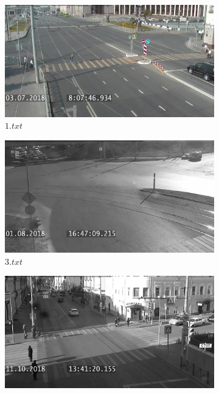 \begin{figure}[!htb]
	\centering
	\begin{subfigure}[!htb]{0.48\textwidth}
		\centering{}
		\includegraphics[width=\textwidth]{images/is-1.jpg}
		\caption{$1.txt$}
		\label{fig:is_1}
	\end{subfigure}
	\hfill
	\begin{subfigure}[!htb]{0.48\textwidth}
		\centering{}
		\includegraphics[width=\textwidth]{images/is-2.jpg}
		\caption{$3.txt$}
		\label{fig:is_2}
	\end{subfigure}
	\hfill
	\begin{subfigure}[!htb]{0.48\textwidth}
		\centering{}
		\includegraphics[width=\textwidth]{images/is-3.jpg}

\end{subfigure}
\end{figure}
